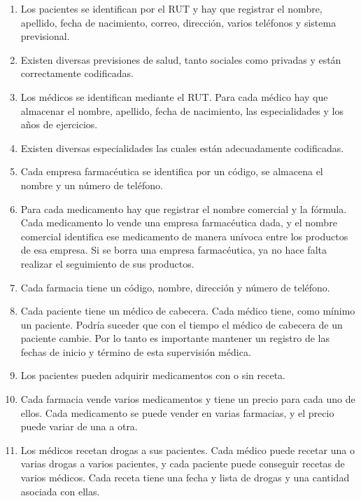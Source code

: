 \documentclass[letter,12pt]{report}
\begin{document}
\begin{enumerate}
  \item Los pacientes se identifican por el RUT y hay que registrar el nombre, apellido, fecha de nacimiento, correo, dirección, varios teléfonos y sistema previsional.
  \item Existen diversas previsiones de salud, tanto sociales como privadas y están correctamente codificadas.

  \item Los médicos se identifican mediante el RUT. Para cada médico hay que almacenar el nombre, apellido, fecha de nacimiento, las especialidades y los años de ejercicios.

  \item Existen diversas especialidades las cuales están adecuadamente codificadas.

  \item Cada empresa farmacéutica se identifica por un código, se almacena el nombre y un número de teléfono.

 \item  Para cada medicamento hay que registrar el nombre comercial y la fórmula. Cada medicamento lo vende una empresa farmacéutica dada, y el nombre comercial identifica ese medicamento de manera unívoca entre los productos de esa empresa. Si se borra una empresa farmacéutica, ya no hace falta realizar el seguimiento de sus productos.

 \item  Cada farmacia tiene un código, nombre, dirección y número de teléfono.

 \item  Cada paciente tiene un médico de cabecera. Cada médico tiene, como mínimo un paciente. Podría suceder que con el tiempo el médico de cabecera de un paciente cambie. Por lo tanto es importante mantener un registro de las fechas de inicio y término de esta supervisión médica.
 \item Los pacientes pueden adquirir medicamentos con o sin receta.

\item   Cada farmacia vende varios medicamentos y tiene un precio para cada uno de ellos. Cada medicamento se puede vender en varias farmacias, y el precio puede variar de una a otra.

 \item  Los médicos recetan drogas a sus pacientes. Cada médico puede recetar una o varias drogas a varios pacientes, y cada paciente puede conseguir recetas de varios médicos. Cada receta tiene una fecha y lista de drogas y una cantidad asociada con ellas.


\end{enumerate}
\end{document}
